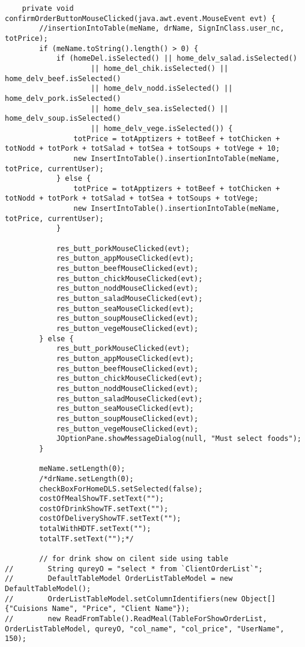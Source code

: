 \documentclass[12pt,a4paper]{article}
\begin{document}
\begin{lstlisting}
    private void confirmOrderButtonMouseClicked(java.awt.event.MouseEvent evt) {                                                
        //insertionIntoTable(meName, drName, SignInClass.user_nc, totPrice);
        if (meName.toString().length() > 0) {
            if (homeDel.isSelected() || home_delv_salad.isSelected()
                    || home_del_chik.isSelected() || home_delv_beef.isSelected()
                    || home_delv_nodd.isSelected() || home_delv_pork.isSelected()
                    || home_delv_sea.isSelected() || home_delv_soup.isSelected()
                    || home_delv_vege.isSelected()) {
                totPrice = totApptizers + totBeef + totChicken + totNodd + totPork + totSalad + totSea + totSoups + totVege + 10;
                new InsertIntoTable().insertionIntoTable(meName, totPrice, currentUser);
            } else {
                totPrice = totApptizers + totBeef + totChicken + totNodd + totPork + totSalad + totSea + totSoups + totVege;
                new InsertIntoTable().insertionIntoTable(meName, totPrice, currentUser);
            }

            res_butt_porkMouseClicked(evt);
            res_button_appMouseClicked(evt);
            res_button_beefMouseClicked(evt);
            res_button_chickMouseClicked(evt);
            res_button_noddMouseClicked(evt);
            res_button_saladMouseClicked(evt);
            res_button_seaMouseClicked(evt);
            res_button_soupMouseClicked(evt);
            res_button_vegeMouseClicked(evt);
        } else {
            res_butt_porkMouseClicked(evt);
            res_button_appMouseClicked(evt);
            res_button_beefMouseClicked(evt);
            res_button_chickMouseClicked(evt);
            res_button_noddMouseClicked(evt);
            res_button_saladMouseClicked(evt);
            res_button_seaMouseClicked(evt);
            res_button_soupMouseClicked(evt);
            res_button_vegeMouseClicked(evt);
            JOptionPane.showMessageDialog(null, "Must select foods");
        }

        meName.setLength(0);
        /*drName.setLength(0);
        checkBoxForHomeDLS.setSelected(false);
        costOfMealShowTF.setText("");
        costOfDrinkShowTF.setText("");
        costOfDeliveryShowTF.setText("");
        totalWithHDTF.setText("");
        totalTF.setText("");*/

        // for drink show on cilent side using table
//        String qureyO = "select * from `ClientOrderList`";
//        DefaultTableModel OrderListTableModel = new DefaultTableModel();
//        OrderListTableModel.setColumnIdentifiers(new Object[]{"Cuisions Name", "Price", "Client Name"});
//        new ReadFromTable().ReadMeal(TableForShowOrderList, OrderListTableModel, qureyO, "col_name", "col_price", "UserName", 150);


\end{lstlisting}
\end{document}
